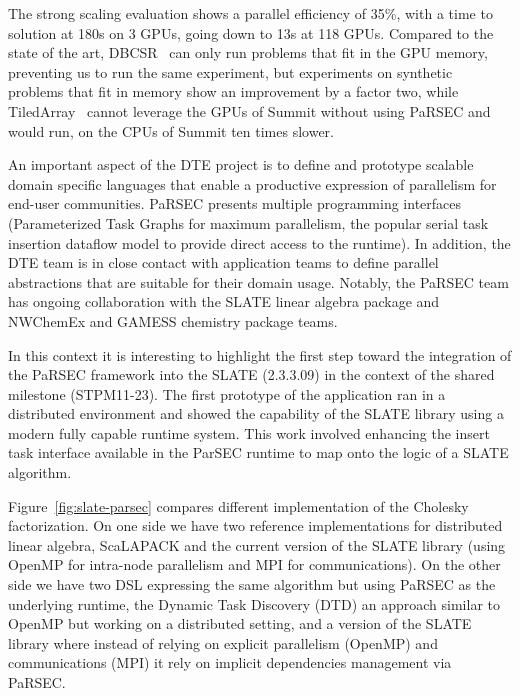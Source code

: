 The strong scaling evaluation shows a parallel efficiency of 35\%,
with a time to solution at 180s on 3 GPUs, going down to 13s at 118
GPUs.
Compared to the state of the art, DBCSR~\cite{parsec::dbcsr} can only
run problems that fit in the GPU memory, preventing us to run the same
experiment, but experiments on synthetic problems that fit in memory
show an improvement by a factor two, while
TiledArray~\cite{parsec::tiledarray} cannot leverage the GPUs of
Summit without using PaRSEC and would run, on the CPUs of Summit ten
times slower.
%
%


An important aspect of the DTE project is to define and prototype scalable
domain specific languages that enable a productive expression of parallelism for
end-user communities. PaRSEC presents multiple programming interfaces
(Parameterized Task Graphs for maximum parallelism, the popular serial task
insertion dataflow model to provide direct access to the runtime). In addition,
the DTE team is in close contact with application teams to define parallel
abstractions that are suitable for their domain usage. Notably, the PaRSEC team
has ongoing collaboration with the SLATE linear algebra package and NWChemEx and
GAMESS chemistry package teams.

In this context it is interesting to highlight the first step toward
the integration of the PaRSEC framework into the SLATE (2.3.3.09) in
the context of the shared milestone (STPM11-23). The first prototype
of the application ran in a distributed environment and showed the
capability of the SLATE library using a modern fully capable runtime
system. This work involved enhancing the insert task interface
available in the ParSEC runtime to map onto the logic of a SLATE
algorithm.

Figure~\ref{fig:slate-parsec} compares different implementation of the
Cholesky factorization. On one side we have two reference
implementations for distributed linear algebra, ScaLAPACK and the
current version of the SLATE library (using OpenMP for intra-node
parallelism and MPI for communications). On the other side we have two
DSL expressing the same algorithm but using PaRSEC as the underlying
runtime, the Dynamic Task Discovery (DTD) an approach similar to
OpenMP but working on a distributed setting, and a version of the
SLATE library where instead of relying on explicit parallelism
(OpenMP) and communications (MPI) it rely on implicit dependencies
management via PaRSEC.


